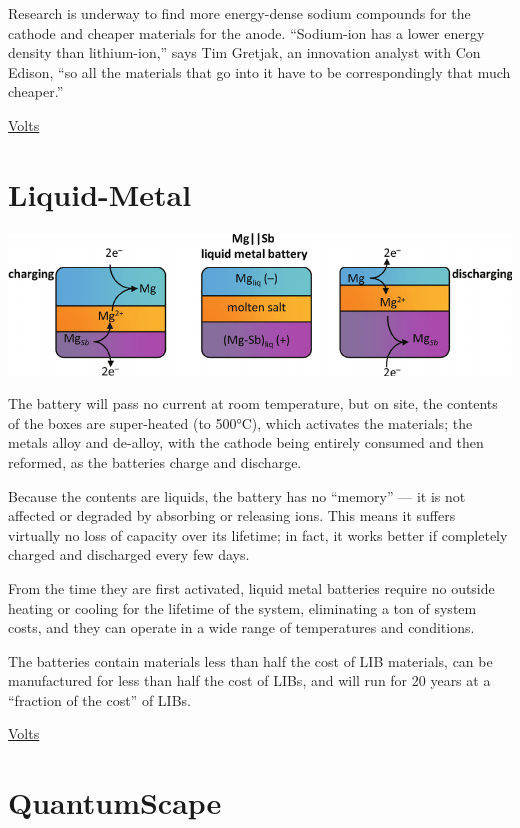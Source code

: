 \documentclass[
]{book}
\begin{document}
Research is underway to find more energy-dense sodium compounds for the cathode and cheaper materials for the anode. ``Sodium-ion has a lower energy density than lithium-ion,'' says Tim Gretjak, an innovation analyst with Con Edison, ``so all the materials that go into it have to be correspondingly that much cheaper.''

\href{https://www.volts.wtf/p/battery-week-competitors-to-lithium}{Volts}

\hypertarget{liquid-metal}{%
\section{Liquid-Metal}\label{liquid-metal}}

\includegraphics{fig/liquid_metal_battery.png}

The battery will pass no current at room temperature, but on site, the contents of the boxes are super-heated (to 500°C), which activates the materials; the metals alloy and de-alloy, with the cathode being entirely consumed and then reformed, as the batteries charge and discharge.

Because the contents are liquids, the battery has no ``memory'' --- it is not affected or degraded by absorbing or releasing ions. This means it suffers virtually no loss of capacity over its lifetime; in fact, it works better if completely charged and discharged every few days.

From the time they are first activated, liquid metal batteries require no outside heating or cooling for the lifetime of the system, eliminating a ton of system costs, and they can operate in a wide range of temperatures and conditions.

The batteries contain materials less than half the cost of LIB materials, can be manufactured for less than half the cost of LIBs, and will run for 20 years at a ``fraction of the cost'' of LIBs.

\href{https://www.volts.wtf/p/battery-week-competitors-to-lithium}{Volts}

\hypertarget{quantumscape}{%
\section{QuantumScape}\label{quantumscape}}
\end{document}
